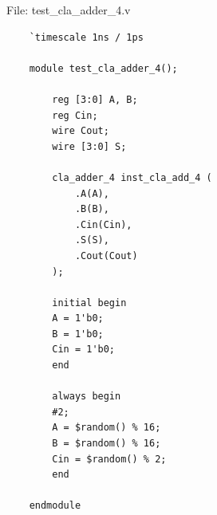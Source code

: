 \documentclass{article}
\begin{document}
File: test\_cla\_adder\_4.v
\begin{lstlisting}
    `timescale 1ns / 1ps

    module test_cla_adder_4();
    
        reg [3:0] A, B;
        reg Cin;
        wire Cout;
        wire [3:0] S;
    
        cla_adder_4 inst_cla_add_4 (
            .A(A),
            .B(B),
            .Cin(Cin),
            .S(S),
            .Cout(Cout)
        );
    
        initial begin
        A = 1'b0;
        B = 1'b0;
        Cin = 1'b0;
        end
    
        always begin
        #2;
        A = $random() % 16;
        B = $random() % 16;
        Cin = $random() % 2;
        end
    
    endmodule    
\end{lstlisting}
\end{document}
